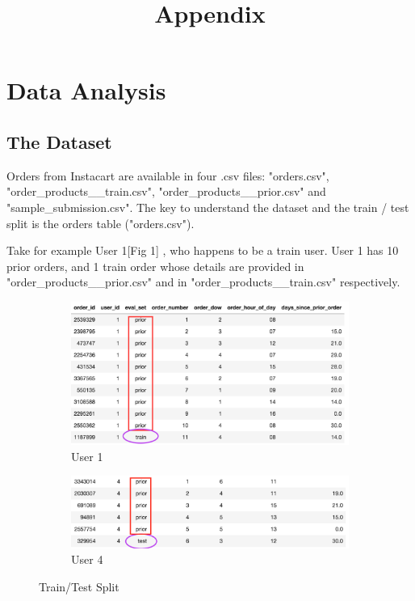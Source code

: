 \documentclass[12pt]{article}
\begin{document}

\title{Appendix}
\date{}

\maketitle

\section*{Data Analysis}

\subsection*{The Dataset}

Orders from Instacart are available in four .csv files: "orders.csv", "order\_products\_\_train.csv", "order\_products\_\_prior.csv" and "sample\_submission.csv". The key to understand the dataset and the train / test split is the orders table ("orders.csv").

Take for example User 1[Fig 1] , who happens to be a train user. User 1 has 10 prior orders, and 1 train order whose details are provided in "order\_products\_\_prior.csv" and in "order\_products\_\_train.csv" respectively.

\begin{figure}[!bp]
  \begin{subfigure}[b]{0.4\textwidth}
    \includegraphics[width=\textwidth]{train_user.png}
    \caption{User 1}
    \label{fig:f1}
  \end{subfigure}
  \hfill
  \begin{subfigure}[b]{0.4\textwidth}
    \includegraphics[width=\textwidth]{test_user.png}
    \caption{User 4}
    \label{fig:f2}
  \end{subfigure}
  \caption{Train/Test Split}
\end{figure}
\end{document}
